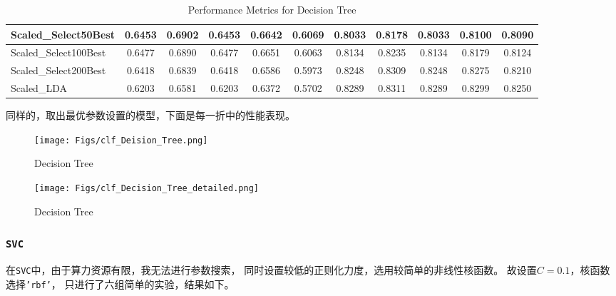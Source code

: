 \documentclass[12pt, a4paper, oneside]{ctexart}
\begin{document}
\begin{table}[H]
{\begin{tabular}{|l|c|c|c|c|c|c|c|c|c|c|}
    Scaled\_Select50Best & 0.6453 & 0.6902 & 0.6453 & 0.6642 & 0.6069 & 0.8033 & 0.8178 & 0.8033 & 0.8100 & 0.8090 \\ \hline
    Scaled\_Select100Best & 0.6477 & 0.6890 & 0.6477 & 0.6651 & 0.6063 & 0.8134 & 0.8235 & 0.8134 & 0.8179 & 0.8124 \\ \hline
    Scaled\_Select200Best & 0.6418 & 0.6839 & 0.6418 & 0.6586 & 0.5973 & 0.8248 & 0.8309 & 0.8248 & 0.8275 & 0.8210 \\ \hline
    Scaled\_LDA & 0.6203 & 0.6581 & 0.6203 & 0.6372 & 0.5702 & 0.8289 & 0.8311 & 0.8289 & 0.8299 & 0.8250 \\ \hline
    \end{tabular}
    }
    \caption{Performance Metrics for Decision Tree}
\end{table}

同样的，取出最优参数设置的模型，下面是每一折中的性能表现。

\begin{figure}[H]
    \centering
    \texttt{[image: Figs/clf\_Deision\_Tree.png]}
    \caption{Decision Tree}
\end{figure}

\begin{figure}[H]
    \centering
    \texttt{[image: Figs/clf\_Decision\_Tree\_detailed.png]}
    \caption{Decision Tree}
\end{figure}

\subsubsection{\texttt{SVC}}
在\texttt{SVC}中，由于算力资源有限，我无法进行参数搜索，
同时设置较低的正则化力度，选用较简单的非线性核函数。
故设置$C=0.1$，核函数选择\texttt{'rbf'}，
只进行了六组简单的实验，结果如下。

\begin{table}[H]
    \centering
    \small %
    \setlength{\tabcolsep}{3.5pt} %
    \caption{Performance Metrics for SVC}
\end{table}
\end{document}
